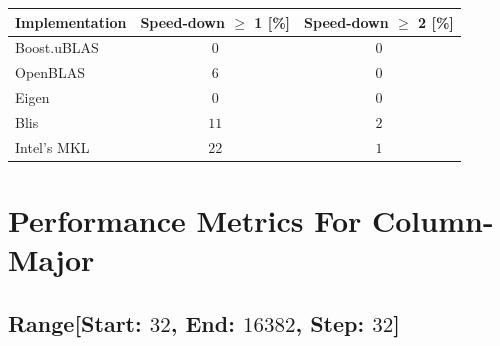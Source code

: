 \begin{table}[ht]
    \begin{tabular}{|l|c|c|}
        \hline
        \textbf{Implementation} & \textbf{Speed-down $\geq$ 1 [\%]} & \textbf{Speed-down $\geq$ 2 [\%]}\\
        \hline
        Boost.uBLAS & $0$ & $0$ \\
        \hline
        OpenBLAS    & $6$ & $0$ \\
        \hline
        Eigen       & $0$ & $0$ \\
        \hline
        Blis        & $11$ & $2$ \\
        \hline
        Intel's MKL & $22$ & $1$ \\
        \hline
    \end{tabular}
\end{table}

\clearpage
\section{Performance Metrics For Column-Major}

\subsection*{Range[Start: $32$, End: $16382$, Step: $32$]}

